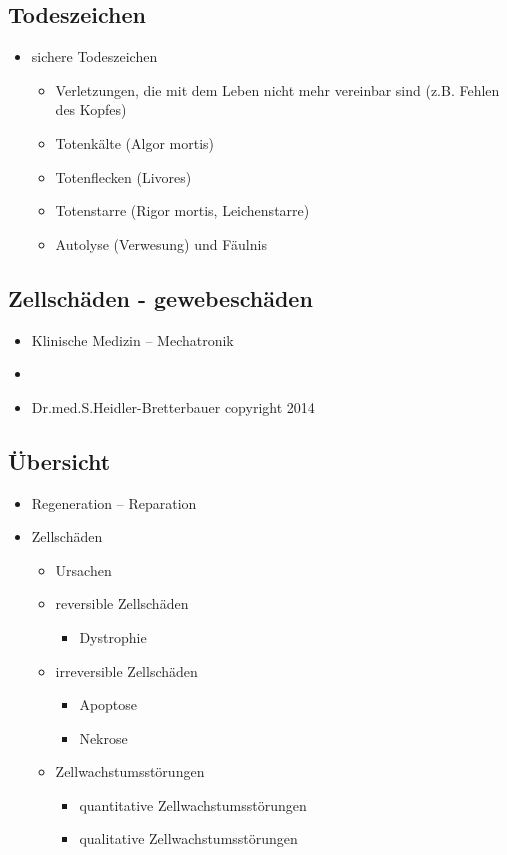 \begin{it>emize}
\subsection{Todeszeichen}
\begin{itemize}
\item sichere Todeszeichen
\begin{itemize}
\item Verletzungen, die mit dem Leben nicht mehr vereinbar sind (z.B. Fehlen des Kopfes)
\item Totenkälte (Algor mortis)
\item Totenflecken (Livores)
\item Totenstarre (Rigor mortis, Leichenstarre)
\item Autolyse (Verwesung) und Fäulnis
\end{itemize}
\end{itemize}

\subsection{Zellschäden - gewebeschäden}
\begin{itemize}
\item Klinische Medizin – Mechatronik
\item 
\item Dr.med.S.Heidler-Bretterbauer	copyright 2014
\end{itemize}

\subsection{Übersicht}
\begin{itemize}
\item Regeneration – Reparation
\item Zellschäden
\begin{itemize}
\item Ursachen
\item reversible Zellschäden
\begin{itemize}
\item Dystrophie
\end{itemize}
\item irreversible Zellschäden
\begin{itemize}
\item Apoptose
\item Nekrose
\end{itemize}
\item Zellwachstumsstörungen
\begin{itemize}
\item quantitative Zellwachstumsstörungen
\item qualitative Zellwachstumsstörungen
\end{itemize}
\end{itemize}


\end{itemize}
\end{it>emize}
